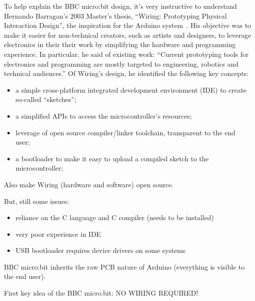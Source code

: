 To help explain the BBC micro:bit design, it's very instructive to understand
Hernando Barragan's 2003 Master's thesis, ``Wiring: Prototyping Physical Interaction Design'',
the inspiration for the Arduino system~\cite{Barragan}. His objective was to make it easier
for non-technical creators, such as artists and designers, to leverage
electronics in their their work by simplifying the hardware and programming
experience. In particular, he said of existing work:
``Current prototyping tools for electronics and programming are mostly targeted 
to engineering, robotics and technical audiences.''  
Of Wiring's design, he identified the following key concepts:
\begin{itemize}
\item a simple cross-platform integrated development environment (IDE) to create so-called ``sketches'';
\item a simplified APIs to access the microcontroller's resources;
\item leverage of open source compiler/linker toolchain, transparent to the end user;
\item a bootloader to make it easy to upload a compiled sketch to the microcontroller;
\end{itemize}
Also make Wiring (hardware and software) open source.

But, still some issues:
\begin{itemize}
    \item reliance on the C language and C compiler (needs to be installed)
    \item very poor experience in IDE
    \item USB bootloader requires device drivers on some systems
\end{itemize}

BBC micro:bit inherits the raw PCB nature of Arduino (everything is visible to the end user).

First key idea of the BBC micro:bit: NO WIRING REQUIRED!



